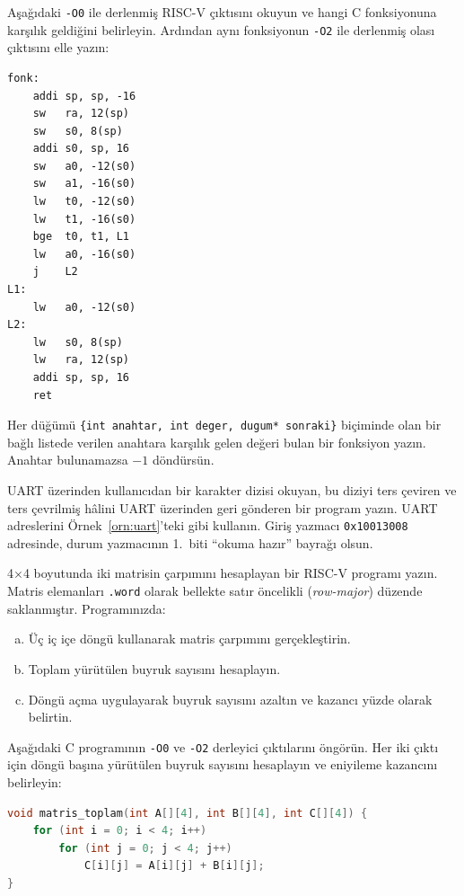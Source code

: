 \begin{alistirma}[\orta]
Aşağıdaki \texttt{-O0} ile derlenmiş RISC-V çıktısını okuyun ve hangi C fonksiyonuna karşılık geldiğini belirleyin. Ardından aynı fonksiyonun \texttt{-O2} ile derlenmiş olası çıktısını elle yazın:
\begin{lstlisting}[style=riscv]
fonk:
    addi sp, sp, -16
    sw   ra, 12(sp)
    sw   s0, 8(sp)
    addi s0, sp, 16
    sw   a0, -12(s0)
    sw   a1, -16(s0)
    lw   t0, -12(s0)
    lw   t1, -16(s0)
    bge  t0, t1, L1
    lw   a0, -16(s0)
    j    L2
L1:
    lw   a0, -12(s0)
L2:
    lw   s0, 8(sp)
    lw   ra, 12(sp)
    addi sp, sp, 16
    ret
\end{lstlisting}
\end{alistirma}

\begin{alistirma}[\orta]
Her düğümü \texttt{\{int anahtar, int deger, dugum* sonraki\}} biçiminde olan bir bağlı listede verilen anahtara karşılık gelen değeri bulan bir fonksiyon yazın. Anahtar bulunamazsa $-1$ döndürsün.
\end{alistirma}

\begin{alistirma}[\orta]
UART üzerinden kullanıcıdan bir karakter dizisi okuyan, bu diziyi ters çeviren ve ters çevrilmiş hâlini UART üzerinden geri gönderen bir program yazın. UART adreslerini Örnek~\ref{orn:uart}'teki gibi kullanın. Giriş yazmacı \texttt{0x10013008} adresinde, durum yazmacının 1.\ biti ``okuma hazır'' bayrağı olsun.
\end{alistirma}

\begin{alistirma}[\zor]
4$\times$4 boyutunda iki matrisin çarpımını hesaplayan bir RISC-V programı yazın. Matris elemanları \texttt{.word} olarak bellekte satır öncelikli (\emph{row-major}) düzende saklanmıştır. Programınızda:
\begin{enumerate}[(a)]
\item Üç iç içe döngü kullanarak matris çarpımını gerçekleştirin.
\item Toplam yürütülen buyruk sayısını hesaplayın.
\item Döngü açma uygulayarak buyruk sayısını azaltın ve kazancı yüzde olarak belirtin.
\end{enumerate}
\end{alistirma}

\begin{alistirma}[\zor]
Aşağıdaki C programının \texttt{-O0} ve \texttt{-O2} derleyici çıktılarını öngörün. Her iki çıktı için döngü başına yürütülen buyruk sayısını hesaplayın ve eniyileme kazancını belirleyin:
\begin{lstlisting}[language=C, style=alistirma-kod]
void matris_toplam(int A[][4], int B[][4], int C[][4]) {
    for (int i = 0; i < 4; i++)
        for (int j = 0; j < 4; j++)
            C[i][j] = A[i][j] + B[i][j];
}
\end{lstlisting}
\end{alistirma}

